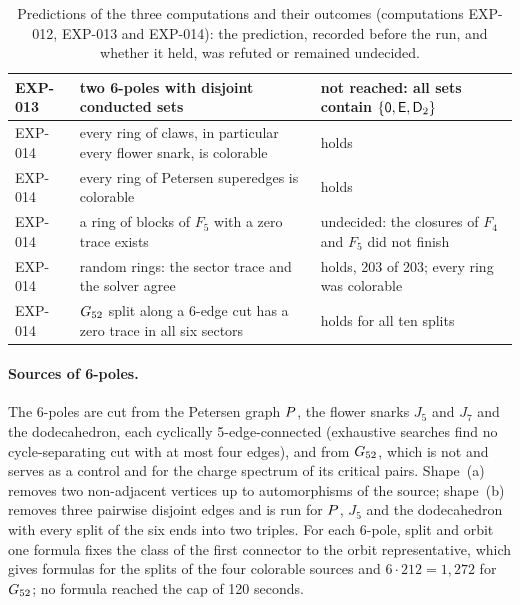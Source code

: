 \begin{table}[t]
\begin{tabular}{p{1.9cm}>{\raggedright\arraybackslash}p{6.2cm}>{\raggedright\arraybackslash}p{5.5cm}}
EXP-013 & two 6-poles with disjoint conducted sets & not reached: all sets contain $\{\mathsf{0},\mathsf{E},\mathsf{D}_2\}$ \\
\midrule
EXP-014 & every ring of claws, in particular every flower snark, is colorable & holds \\
EXP-014 & every ring of Petersen superedges is colorable & holds \\
EXP-014 & a ring of blocks of $F_5$ with a zero trace exists & undecided: the closures of $F_4$ and $F_5$ did not finish \\
EXP-014 & random rings: the sector trace and the solver agree & holds, 203 of 203; every ring was colorable \\
EXP-014 & $G_{52}$ split along a 6-edge cut has a zero trace in all six sectors & holds for all ten splits \\
\bottomrule
\end{tabular}
\caption{Predictions of the three computations and their outcomes (computations EXP-012, EXP-013 and EXP-014): the prediction, recorded before the run, and
whether it held, was refuted or remained undecided.}\label{tab:preds}
\end{table}

\paragraph{Sources of 6-poles.} The 6-poles are cut from the Petersen graph $P$, the flower snarks $J_5$ and $J_7$ and the
dodecahedron, each cyclically 5-edge-connected (exhaustive searches find no cycle-separating cut with at most four edges), and from
$G_{52}$, which is not and serves as a control and for the charge spectrum of its critical pairs. Shape~(a) removes two
non-adjacent vertices up to automorphisms of the source; shape~(b) removes three pairwise disjoint edges and is run for $P$, $J_5$
and the dodecahedron with every split of the six ends into two triples. For each 6-pole, split and orbit one formula fixes the class of the first connector
to the orbit representative, which gives \nFormulasSix{} formulas for the \nSplits{} splits of the four colorable sources and
$6 \cdot 212 = 1{,}272$ for $G_{52}$; no formula reached the cap of 120 seconds.

